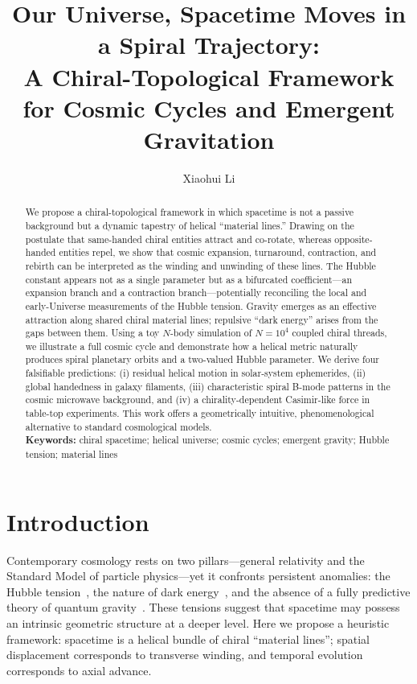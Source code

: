 \documentclass[12pt,a4paper]{article}
\title{\textbf{Our Universe, Spacetime Moves in a Spiral Trajectory:}\\[0.2em]
\large A Chiral-Topological Framework for Cosmic Cycles and Emergent Gravitation}
\author[1]{Xiaohui Li}
\affil[1]{Independent Researcher, Baoji 721000, China}
\affil[ ]{\textit{Correspondence: Xiaohui Li (email: danceluck@163.com)}}
\affil[ ]{\textit{ORCID: 0009-0003-8233-7191}}
\affil[ ]{\textit{Data homepage: \url{https://github.com/xiaohui-li-lab/2026-11-6/}}}
\date{}
\begin{document}
\maketitle

\begin{abstract}
\noindent
We propose a chiral-topological framework in which spacetime is not a passive background but a dynamic tapestry of helical ``material lines.'' Drawing on the postulate that same-handed chiral entities attract and co-rotate, whereas opposite-handed entities repel, we show that cosmic expansion, turnaround, contraction, and rebirth can be interpreted as the winding and unwinding of these lines. The Hubble constant appears not as a single parameter but as a bifurcated coefficient---an expansion branch and a contraction branch---potentially reconciling the local and early-Universe measurements of the Hubble tension. Gravity emerges as an effective attraction along shared chiral material lines; repulsive ``dark energy'' arises from the gaps between them. Using a toy $N$-body simulation of $N=10^4$ coupled chiral threads, we illustrate a full cosmic cycle and demonstrate how a helical metric naturally produces spiral planetary orbits and a two-valued Hubble parameter. We derive four falsifiable predictions: (i) residual helical motion in solar-system ephemerides, (ii) global handedness in galaxy filaments, (iii) characteristic spiral B-mode patterns in the cosmic microwave background, and (iv) a chirality-dependent Casimir-like force in table-top experiments. This work offers a geometrically intuitive, phenomenological alternative to standard cosmological models.
\\[0.8em]
\noindent\textbf{Keywords:} chiral spacetime; helical universe; cosmic cycles; emergent gravity; Hubble tension; material lines
\end{abstract}

\section*{Introduction}

Contemporary cosmology rests on two pillars---general relativity and the Standard Model of particle physics---yet it confronts persistent anomalies: the Hubble tension~\cite{riess2016,planck2020}, the nature of dark energy~\cite{zeldovich1968}, and the absence of a fully predictive theory of quantum gravity~\cite{ambjorn2012}. These tensions suggest that spacetime may possess an intrinsic geometric structure at a deeper level. Here we propose a heuristic framework: spacetime is a helical bundle of chiral ``material lines''; spatial displacement corresponds to transverse winding, and temporal evolution corresponds to axial advance.
\end{document}
